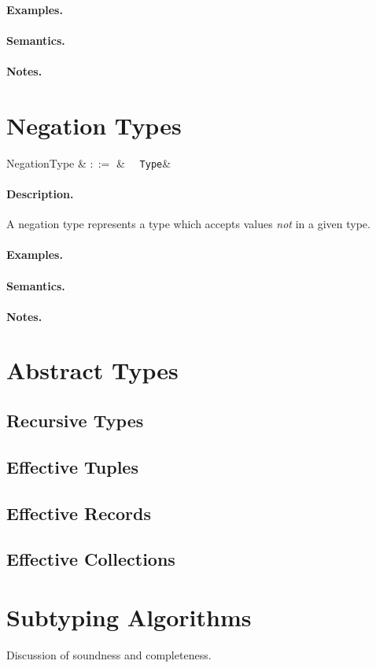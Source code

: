 \paragraph{Examples.}

\paragraph{Semantics.}

\paragraph{Notes.}


\section{Negation Types}

\begin{syntax}
  NegationType & $::=$ & \token{!}\ \ \verb+Type+&\\
\end{syntax}

\paragraph{Description.}  A negation type represents a type which
accepts values {\em not} in a given type.

\paragraph{Examples.}

\paragraph{Semantics.}

\paragraph{Notes.}

\section{Abstract Types}
\subsection{Recursive Types}
\subsection{Effective Tuples}
\subsection{Effective Records}
\subsection{Effective Collections}

\section{Subtyping Algorithms}
Discussion of soundness and completeness.

